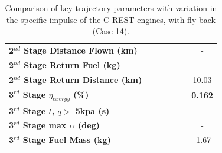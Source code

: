 \begin{table}[ht]
\begin{tabular}{l c c c c c c}
		\textbf{2$^{nd}$ Stage Distance Flown (km)}
		& \SecondDistIspNinety
		& \SecondDistIspNinetyFive
		& \SecondDistIspStandard
		& \SecondDistIspOneHundredFive
		& \SecondDistIspOneHundredTen
		& -
		\\
		\textbf{2$^{nd}$ Stage Return Fuel (kg)}
		& \returnFuelIspNinety
		& \returnFuelIspNinetyFive
		& \returnFuelIspStandard
		& \returnFuelIspOneHundredFive
		& \returnFuelIspOneHundredTen
		& -
		\\
		\textbf{2$^{nd}$ Stage Return Distance (km)}
		& \returnDistIspNinety
		& \returnDistIspNinetyFive
		& \returnDistIspStandard
		& \returnDistIspOneHundredFive
		& \returnDistIspOneHundredTen
		&10.03
		\\
		\hline 
		\textbf{3$^{rd}$ Stage $\eta_{exergy}$ (\%)}
		& \textbf{\thirddExergyEffIspNinety}
		& \textbf{\thirddExergyEffIspNinetyFive}
		& \textbf{\thirddExergyEffIspStandard}
		& \textbf{\thirddExergyEffIspOneHundredFive}
		& \textbf{\thirddExergyEffIspOneHundredTen}
		& \textbf{0.162}
		\\
		\textbf{3$^{rd}$ Stage $t$, $q >$ 5kpa (s)}
		& \thirdqOverFiveIspNinety
		& \thirdqOverFiveIspNinetyFive
		& \thirdqOverFiveIspStandard
		& \thirdqOverFiveIspOneHundredFive
		& \thirdqOverFiveIspOneHundredTen
		& -
		\\
		\textbf{3$^{rd}$ Stage max $\alpha$ (deg)}
		& \thirdmaxAoAIspNinety
		& \thirdmaxAoAIspNinetyFive
		& \thirdmaxAoAIspStandard
		& \thirdmaxAoAIspOneHundredFive
		& \thirdmaxAoAIspOneHundredTen
		& -
		\\
		\textbf{3$^{rd}$ Stage Fuel Mass (kg)}
		& \thirdmFuelIspNinety
		& \thirdmFuelIspNinetyFive
		& \thirdmFuelIspStandard
		& \thirdmFuelIspOneHundredFive
		& \thirdmFuelIspOneHundredTen
		&-1.67
		\\
		\hline 
	\end{tabular} 
	
	\caption{Comparison of key trajectory parameters with variation in the specific impulse of the C-REST engines, with fly-back (Case 14).}
	\label{tab:comparison31}
\end{table}

